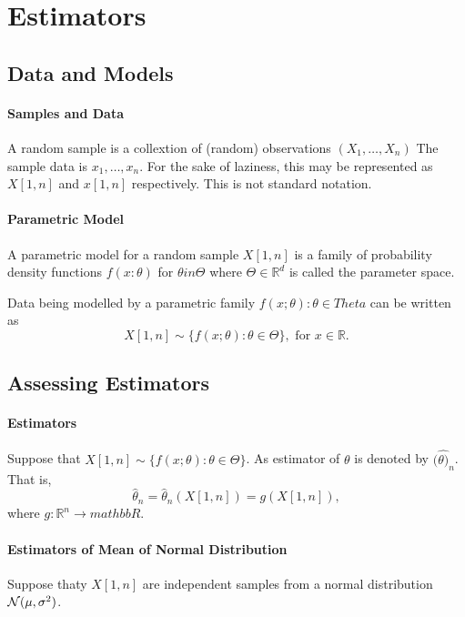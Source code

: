\section{Estimators}

\subsection{Data and Models}

\paragraph{Samples and Data}
A random sample is a collextion of (random) observations
\((X_1, \ldots, X_n)\)
The sample data is \(x_1, \ldots, x_n\).
For the sake of laziness, this may be represented as
\(X[1, n]\) and  \(x[1, n]\) respectively.
This is not standard notation.

\paragraph{Parametric Model}
A parametric model for a random sample \(X[1, n]\)
is a family of probability density functions
\(f(x : \theta)\) for \(\theta in \Theta\) where \(\Theta \in  \mathbb{R}^d\)
is called the parameter space.

Data being modelled by a parametric family \(f(x; \theta): \theta \in  Theta\)
can be written as \[
  X[1, n] \sim \{f(x; \theta) : \theta \in \Theta\}, \text{ for } x \in \mathbb{R}
.\] 

\subsection{Assessing Estimators}

\paragraph{Estimators}
Suppose that \(X[1, n] \sim \{f(x; \theta) : \theta \in \Theta\} \).
As estimator of \(\theta\) is denoted by \((\hat{\theta)}_n\).
That is, \[
  \hat{\theta}_n = \hat{\theta}_n(X[1, n]) = g(X[1, n]),
\]  where \(g: \mathbb{R}^n \to mathbb{R}\).

\paragraph{Estimators of Mean of Normal Distribution}
Suppose thaty \(X[1, n]\) are independent samples from a normal distribution
\(\mathcal{N}(\mu, \sigma^2)\).

